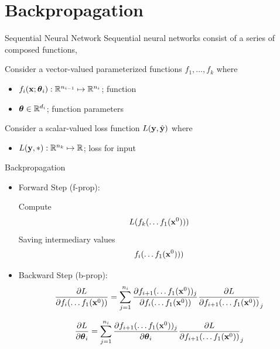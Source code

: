 \documentclass{beamer}
\begin{document}
\section{Backpropagation}

\begin{frame}{Sequential Neural Network}
  Sequential neural networks consist of a series of composed functions,

  Consider a vector-valued parameterized functions $f_1, \ldots, f_{k}$ where

  \begin{itemize}
  \item $f_i(\mathbf{x};\boldsymbol{\theta}_i): \mathbb{R}^{n_{i-1}} \mapsto \mathbb{R}^{n_{i}}$; function
  \item $\boldsymbol{\theta} \in \mathbb{R}^{d_i}$; function parameters
  \end{itemize}

  Consider a scalar-valued loss function  $L(\mathbf{y}, \hat{\mathbf{y}})$ where

  \begin{itemize}
  \item $L(\mathbf{y}, *): \mathbb{R}^{n_k} \mapsto \mathbb{R}$; loss for input
  \end{itemize}
\end{frame}


\begin{frame}{Backpropagation}
  \begin{itemize}
  \item Forward Step (f-prop):

    Compute \[L(f_k(\ldots f_1(\mathbf{x}^0)))\]
    Saving intermediary values
    \[f_i(\ldots f_1(\mathbf{x}^0)))\]
  \item Backward Step (b-prop):
    \pause
    \[ \frac{\partial L}{\partial f_i(\ldots f_1(\mathbf{x}^0))  } = \sum_{j =1}^{n_i} \frac{\partial f_{i+1}(\ldots f_1(\mathbf{x}^0))_j} {\partial f_i(\ldots f_1(\mathbf{x}^0)) } \frac{\partial L} {\partial f_{i+1}(\ldots f_1(\mathbf{x}^0))}_j   \]
    \pause

    \[ \frac{\partial L}{\partial \boldsymbol{\theta}_i  } = \sum_{j =1}^{n_i} \frac{\partial f_{i+1}(\ldots f_1(\mathbf{x}^0))_j} {\partial \boldsymbol{\theta}_i } \frac{\partial L} {\partial f_{i+1}(\ldots f_1(\mathbf{x}^0))}_j   \]

  \end{itemize}
\end{frame}
\end{document}
